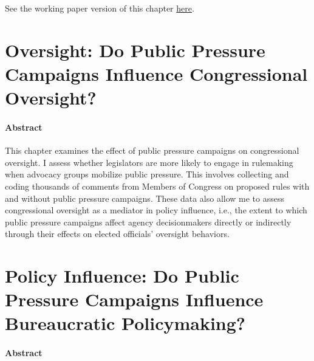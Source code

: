\documentclass[
]{book}
\begin{document}
See the working paper version of this chapter \href{https://judgelord.github.io/research/whymail/}{here}.

\hypertarget{oversight-do-public-pressure-campaigns-influence-congressional-oversight}{%
\chapter{Oversight: Do Public Pressure Campaigns Influence Congressional Oversight?}\label{oversight-do-public-pressure-campaigns-influence-congressional-oversight}}

\hypertarget{abstract-2}{%
\subsubsection*{Abstract}\label{abstract-2}}

This chapter examines the effect of public pressure campaigns on congressional oversight. I assess whether legislators are more likely to engage in rulemaking when advocacy groups mobilize public pressure. This involves collecting and coding thousands of comments from Members of Congress on proposed rules with and without public pressure campaigns. These data also allow me to assess congressional oversight as a mediator in policy influence, i.e., the extent to which public pressure campaigns affect agency decisionmakers directly or indirectly through their effects on elected officials' oversight behaviors.

\hypertarget{policy-influence-do-public-pressure-campaigns-influence-bureaucratic-policymaking}{%
\chapter{Policy Influence: Do Public Pressure Campaigns Influence Bureaucratic Policymaking?}\label{policy-influence-do-public-pressure-campaigns-influence-bureaucratic-policymaking}}

\hypertarget{abstract-3}{%
\subsubsection*{Abstract}\label{abstract-3}}
\end{document}

